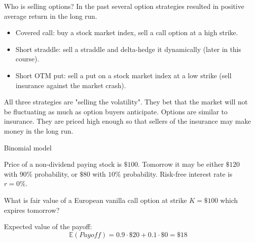 \documentclass{beamer}
\begin{document}
\begin{frame}{Who is selling options?}
\justify
In the past several option strategies resulted in positive average return in the long run.

\justify
\begin{itemize}
\justifying
\item Covered call: buy a stock market index, sell a call option at a high strike.
\item Short straddle: sell a straddle and delta-hedge it dynamically (later in this course).
\item Short OTM put: sell a put on a stock market index at a low strike (sell insurance against the market crash).
\end{itemize}

\justify
All three strategies are "selling the volatility". They bet that the market will not be fluctuating as much as option buyers anticipate. Options are similar to insurance. They are priced high enough so that sellers of the insurance may make money in the long run.
\end{frame}



\newcommand{\drawStockNode}[5]{

	\node (#5)
	[
		draw,
		rectangle,
		rounded corners,
		inner sep = 0pt,
		outer sep = 0pt,
		minimum width = 2.4cm,
		minimum height = 0.55cm,
		align = center
	]
	at (#3, #4)
	{
		\begin{tabular}{c|c}
		#1 & #2
		\end{tabular}
	};
}

\newcommand{\drawStockLink}[4]{

	\draw[
		->,
		>=triangle 90
	]
	(#1.east) -- (#2.west)
	node[
		pos = 0.5,
		anchor = #4
	]
	{#3};
}

\newcommand{\drawOneStepBinomialTree}{
	\drawStockNode{\$100}{?}{0}{0}{S0_node}
	\drawStockNode{\$120}{\$20}{4}{ 1}{Su_node}
	\drawStockNode{\$80}{\$0}{4}{-1}{Sd_node}
	
	\drawStockLink{S0_node}{Su_node}{$90\%$}{south east}	
	\drawStockLink{S0_node}{Sd_node}{$10\%$}{north east}
}

\begin{frame}{Binomial model}
\centering
{}

\justify
Price of a non-dividend paying stock is $\$100$. Tomorrow it may be either $\$120$ with $90\%$ probability, or $\$80$ with  $10\%$ probability. Risk-free interest rate is $r=0\%$.

\justify
What is fair value of a European vanilla call option at strike $K=\$100$ which expires tomorrow?

\justify
Expected value of the payoff:
$$\mathbb{E}(Payoff) = 0.9\cdot \$20 + 0.1\cdot \$0 = \$18 $$
\end{frame}
\end{document}
